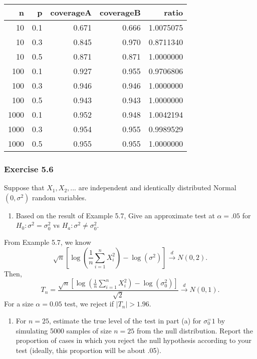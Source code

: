\documentclass[12pt,]{article}
\providecommand{\tightlist}{%
  \setlength{\itemsep}{0pt}\setlength{\parskip}{0pt}}
\begin{document}
\begin{longtable}[]{@{}rrrrr@{}}
\toprule
n & p & coverageA & coverageB & ratio\tabularnewline
\midrule
\endhead
10 & 0.1 & 0.671 & 0.666 & 1.0075075\tabularnewline
10 & 0.3 & 0.845 & 0.970 & 0.8711340\tabularnewline
10 & 0.5 & 0.871 & 0.871 & 1.0000000\tabularnewline
100 & 0.1 & 0.927 & 0.955 & 0.9706806\tabularnewline
100 & 0.3 & 0.946 & 0.946 & 1.0000000\tabularnewline
100 & 0.5 & 0.943 & 0.943 & 1.0000000\tabularnewline
1000 & 0.1 & 0.952 & 0.948 & 1.0042194\tabularnewline
1000 & 0.3 & 0.954 & 0.955 & 0.9989529\tabularnewline
1000 & 0.5 & 0.955 & 0.955 & 1.0000000\tabularnewline
\bottomrule
\end{longtable}

\hypertarget{exercise-5.6}{%
\subsubsection{Exercise 5.6}\label{exercise-5.6}}

Suppose that \(X_1, X_2,...\) are independent and identically
distributed Normal \((0,\sigma^2)\) random variables.

\begin{enumerate}
\def\labelenumi{(\alph{enumi})}
\tightlist
\item
  Based on the result of Example 5.7, Give an approximate test at
  \(\alpha = .05\) for \(H_0:\sigma^2=\sigma_0^2\) vs
  \(H_a:\sigma^2\ne \sigma_0^2.\)
\end{enumerate}

From Example 5.7, we know
\[\sqrt{n}\left[\log\left(\frac{1}{n}\sum_{i=1}^n X_i^2\right)-\log(\sigma^2)\right]\overset{d}\rightarrow N(0,2).\]
Then,
\[T_n = \frac{\sqrt{n}\left[\log\left(\frac{1}{n}\sum_{i=1}^n X_i^2\right)-\log(\sigma_0^2)\right]}{\sqrt{2}}\overset{d}\rightarrow N(0,1).\]
For a size \(\alpha = 0.05\) test, we reject if \(|T_n|>1.96.\)

\begin{enumerate}
\def\labelenumi{(\alph{enumi})}
\setcounter{enumi}{1}
\tightlist
\item
  For \(n=25\), estimate the true level of the test in part (a) for
  \(\sigma_0^=1\) by simulating 5000 samples of size \(n=25\) from the
  null distribution. Report the proportion of cases in which you reject
  the null hypothesis according to your test (ideally, this proportion
  will be about .05).
\end{enumerate}
\end{document}
